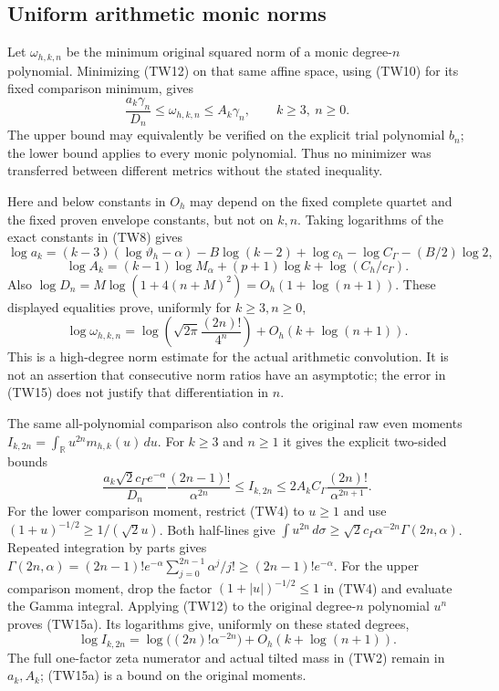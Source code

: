 \documentclass[11pt,a4paper]{article}
\begin{document}
\subsection{Uniform arithmetic monic norms}

Let $\omega_{h,k,n}$ be the minimum original squared norm of a monic
degree-$n$ polynomial.  Minimizing (TW12) on that same affine space,
using (TW10) for its fixed comparison minimum, gives
\[
 \boxed{\frac{a_k\gamma_n}{D_n}\leq\omega_{h,k,n}
 \leq A_k\gamma_n,\qquad k\geq3,\ n\geq0.}\tag{TW14}
\]
The upper bound may equivalently be verified on the explicit trial
polynomial $b_n$; the lower bound applies to every monic polynomial.
Thus no minimizer was transferred between different metrics without
the stated inequality.

Here and below constants in $O_h$ may depend on the fixed complete
quartet and the fixed proven envelope constants, but not on $k,n$.
Taking logarithms of the exact constants in (TW8) gives
\[
 \log a_k=(k-3)(\log\vartheta_h-\alpha)-B\log(k-2)
            +\log c_h-\log C_\Gamma-(B/2)\log2,
\]
\[
 \log A_k=(k-1)\log M_\alpha+(p+1)\log k
                       +\log(C_h/c_\Gamma).
\]
Also $\log D_n=M\log(1+4(n+M)^2)=O_h(1+\log(n+1))$.
These displayed equalities prove, uniformly for $k\geq3,n\geq0$,
\[
 \boxed{\log\omega_{h,k,n}=
 \log\!\left(\sqrt{2\pi}\frac{(2n)!}{4^n}\right)
 +O_h(k+\log(n+1)).}\tag{TW15}
\]
This is a high-degree norm estimate for the actual arithmetic convolution.
It is not an assertion that consecutive norm ratios have an asymptotic;
the error in (TW15) does not justify that differentiation in $n$.

The same all-polynomial comparison also controls the original raw even
moments $I_{k,2n}=\int_{\mathbb R}u^{2n}m_{h,k}(u)\,du$.  For
$k\geq3$ and $n\geq1$ it gives the explicit two-sided bounds
\[
 \boxed{
 \frac{a_k\sqrt2c_\Gamma e^{-\alpha}}{D_n}
       \frac{(2n-1)!}{\alpha^{2n}}
 \leq I_{k,2n}
 \leq2A_k C_\Gamma\frac{(2n)!}{\alpha^{2n+1}}.}
 \tag{TW15a}
\]
For the lower comparison moment, restrict (TW4) to $u\geq1$ and
use $(1+u)^{-1/2}\geq1/(\sqrt2u)$.  Both half-lines give
$\int u^{2n}\,d\sigma\geq\sqrt2c_\Gamma
\alpha^{-2n}\Gamma(2n,\alpha)$.
Repeated integration by parts gives
$\Gamma(2n,\alpha)=(2n-1)!e^{-\alpha}
\sum_{j=0}^{2n-1}\alpha^j/j!\geq(2n-1)!e^{-\alpha}$.
For the upper comparison moment, drop the factor
$(1+|u|)^{-1/2}\leq1$ in (TW4) and evaluate the Gamma integral.
Applying (TW12) to the original degree-$n$ polynomial $u^n$ proves
(TW15a).  Its logarithms give, uniformly on these stated degrees,
\[
 \log I_{k,2n}=\log\bigl((2n)!\alpha^{-2n}\bigr)
                    +O_h(k+\log(n+1)).\tag{TW15b}
\]
The full one-factor zeta numerator and actual tilted mass in (TW2)
remain in $a_k,A_k$; (TW15a) is a bound on the original moments.
\end{document}
